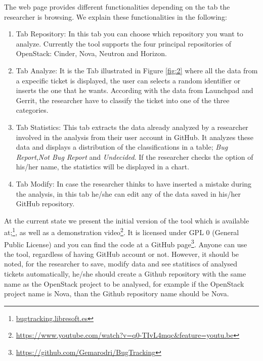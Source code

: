 \documentclass[runningheads,a4paper]{llncs}
\begin{document}
The web page provides different functionalities depending on the tab the researcher is browsing. We explain these functionalities in the following:
\begin{enumerate}
  \item Tab Repository: In this tab you can choose which repository you want to analyze. Currently the tool supports the four principal repositories of OpenStack: Cinder, Nova, Neutron and Horizon.
  \item Tab Analyze: It is the Tab illustrated in Figure \ref{fig:2} where all the data from a expecific ticket is displayed, the user can selects a random identifier or inserts the one that he wants. According with the data from Launchpad and Gerrit, the researcher have to classify the ticket into one of the three categories. %
  \item Tab Statistics: This tab extracts the data already analyzed by a researcher involved in the analysis from their user account in GitHub. It analyzes these data and displays a distribution of the classifications in a table; \textit{Bug Report},\textit{Not Bug Report} and \textit{Undecided}. If the researcher checks the option of his/her name, the statistics will be displayed in a chart.
  \item Tab Modify: In case the researcher thinks to have inserted a mistake during the analysis, in this tab he/she can edit any of the data saved in his/her GitHub repository. 
\end{enumerate}

At the current state we present the initial version of the tool which is available at;\footnote{\url{bugtracking.libresoft.es}}, as well as a demonstration video\footnote{\url{https://www.youtube.com/watch?v=q0-TIvL4mqc&feature=youtu.be}}. It is licensed under GPL 0 (General Public License) and you can find the code at a GitHub page\footnote{\url{https://github.com/Gemarodri/BugTracking}}. Anyone can use the tool, regardless of having GitHub account or not. However, it should be noted, for the researcher to save, modify data and see statitiscs of analysed tickets automatically, he/she should create a Github repository with the same name as the OpenStack project to be analysed, for example if the OpenStack project name is Nova, than the Github repository name should be Nova. 
\end{document}
